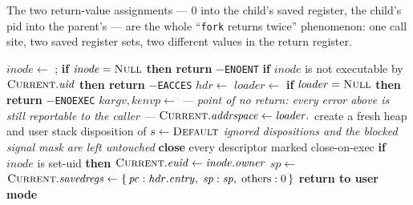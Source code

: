 The two return-value assignments --- $0$ into the child's saved register, the child's pid
into the parent's --- are the whole ``\texttt{fork} returns twice'' phenomenon: one call
site, two saved register sets, two different values in the return register.

\begin{algorithm}[H]
\caption{\texttt{exec(path, argv, envp)} --- replace the caller's program image}
\label{p4:alg:exec}
\begin{algorithmic}[1]
  \State $\mathit{inode} \gets$ ;
         \textbf{if} $\mathit{inode} = \textsc{Null}$ \textbf{then return} $-$\texttt{ENOENT}
  \State \textbf{if} $\mathit{inode}$ is not executable by $\textsc{Current}.\mathit{uid}$
         \textbf{then return} $-$\texttt{EACCES}
  \State $\mathit{hdr} \gets$ 
  \State $\mathit{loader} \gets$ 
  \State \textbf{if} $\mathit{loader} = \textsc{Null}$ \textbf{then return} $-$\texttt{ENOEXEC}
  \State $\mathit{kargv}, \mathit{kenvp} \gets$ 
  \Statex \hspace{\algorithmicindent}\emph{--- point of no return: every error above is still
          reportable to the caller ---}
  \State {}
  \State $\textsc{Current}.\mathit{addrspace} \gets \mathit{loader}.$
  \State create a fresh heap and user stack
    \State disposition of $s \gets \textsc{Default}$
  \EndFor
  \Statex \hspace{\algorithmicindent}\emph{ignored dispositions and the blocked signal
          mask are left untouched}
  \State \textbf{close} every descriptor marked close-on-exec
  \State \textbf{if} $\mathit{inode}$ is set-uid \textbf{then}
         $\textsc{Current}.\mathit{euid} \gets \mathit{inode}.\mathit{owner}$
  \State $\mathit{sp} \gets$ 
  \State $\textsc{Current}.\mathit{savedregs} \gets \{\,\mathit{pc}: \mathit{hdr}.\mathit{entry},\;
         \mathit{sp}: \mathit{sp},\; \text{others}: 0\,\}$
  \State \textbf{return to user mode}
\EndProcedure
\end{algorithmic}
\end{algorithm}

